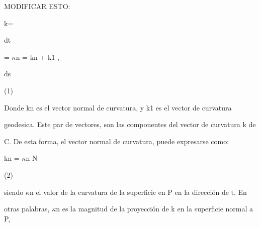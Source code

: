 \documentclass[a4paper,portrait,12pt]{article}
\begin{document}
\begin{flushleft}
MODIFICAR ESTO:
\end{flushleft}


\begin{flushleft}
k=
\end{flushleft}





\begin{flushleft}
dt
\end{flushleft}


\begin{flushleft}
= $\kappa$n = kn + k1 ,
\end{flushleft}


\begin{flushleft}
ds
\end{flushleft}





(1)





\begin{flushleft}
Donde kn es el vector normal de curvatura, y k1 es el vector de curvatura
\end{flushleft}


\begin{flushleft}
geodesica. Este par de vectores, son las componentes del vector de curvatura k de
\end{flushleft}


\begin{flushleft}
C. De esta forma, el vector normal de curvatura, puede expresarse como:
\end{flushleft}


\begin{flushleft}
kn = $\kappa$n N
\end{flushleft}





(2)





\begin{flushleft}
siendo $\kappa$n el valor de la curvatura de la superficie en P en la dirección de t. En
\end{flushleft}


\begin{flushleft}
otras palabras, $\kappa$n es la magnitud de la proyección de k en la superficie normal a P,
\end{flushleft}
\end{document}
